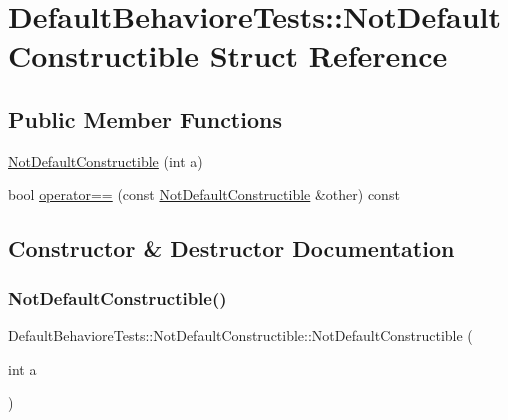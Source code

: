 \hypertarget{structDefaultBehavioreTests_1_1NotDefaultConstructible}{}\section{Default\+Behaviore\+Tests\+::Not\+Default\+Constructible Struct Reference}
\label{structDefaultBehavioreTests_1_1NotDefaultConstructible}
\subsection*{Public Member Functions}
\begin{DoxyCompactItemize}
\item 
\mbox{\hyperlink{structDefaultBehavioreTests_1_1NotDefaultConstructible_a9bf73b60c1efd1cf81f30ac49176b8cb}{Not\+Default\+Constructible}} (int a)
\item 
bool \mbox{\hyperlink{structDefaultBehavioreTests_1_1NotDefaultConstructible_a2cf3251c6f31c6446446b58afcd78e3d}{operator==}} (const \mbox{\hyperlink{structDefaultBehavioreTests_1_1NotDefaultConstructible}{Not\+Default\+Constructible}} \&other) const
\end{DoxyCompactItemize}


\subsection{Constructor \& Destructor Documentation}
\mbox{\label{structDefaultBehavioreTests_1_1NotDefaultConstructible_a9bf73b60c1efd1cf81f30ac49176b8cb}} 
\subsubsection{\texorpdfstring{NotDefaultConstructible()}{NotDefaultConstructible()}}
{\footnotesize\ttfamily Default\+Behaviore\+Tests\+::\+Not\+Default\+Constructible\+::\+Not\+Default\+Constructible (\begin{DoxyParamCaption}\item[{int}]{a }\end{DoxyParamCaption})\hspace{0.3cm}{\ttfamily [inline]}}



